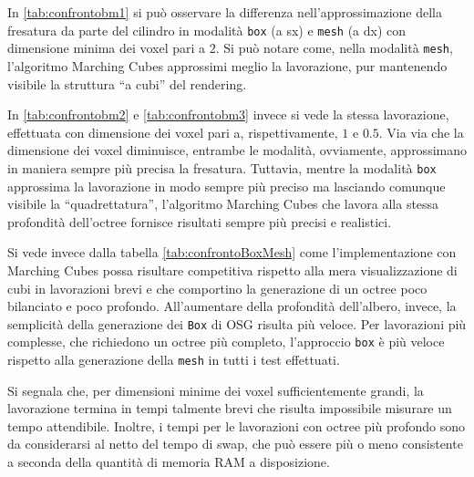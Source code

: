 In \ref{tab:confrontobm1} si può osservare la differenza nell'approssimazione della fresatura da parte del cilindro in modalità \texttt{box} (a sx) e \texttt{mesh} (a dx) con dimensione minima dei voxel pari a $2$. Si può notare come, nella modalità \texttt{mesh}, l'algoritmo Marching Cubes approssimi meglio la lavorazione, pur mantenendo visibile la struttura ``a cubi'' del rendering.

In \ref{tab:confrontobm2} e \ref{tab:confrontobm3} invece si vede la stessa lavorazione, effettuata con dimensione dei voxel pari a, rispettivamente, $1$ e $0.5$. Via via che la dimensione dei voxel diminuisce, entrambe le modalità, ovviamente, approssimano in maniera sempre più precisa la fresatura. Tuttavia, mentre la modalità \texttt{box} approssima la lavorazione in modo sempre più preciso ma lasciando comunque visibile la ``quadrettatura'', l'algoritmo Marching Cubes che lavora alla stessa profondità dell'octree fornisce risultati sempre più precisi e realistici.

Si vede invece dalla tabella \ref{tab:confrontoBoxMesh} come l'implementazione con Marching Cubes possa risultare competitiva rispetto alla mera visualizzazione di cubi in lavorazioni brevi e che comportino la generazione di un octree poco bilanciato e poco profondo. All'aumentare della profondità dell'albero, invece, la semplicità della generazione dei \texttt{Box} di OSG risulta più veloce. Per lavorazioni più complesse, che richiedono un octree più completo, l'approccio \texttt{box} è più veloce rispetto alla generazione della \texttt{mesh} in tutti i test effettuati.

Si segnala che, per dimensioni minime dei voxel sufficientemente grandi, la lavorazione termina in tempi talmente brevi che risulta impossibile misurare un tempo attendibile. Inoltre, i tempi per le lavorazioni con octree più profondo sono da considerarsi al netto del tempo di swap, che può essere più o meno consistente a seconda della quantità di memoria RAM a disposizione.

